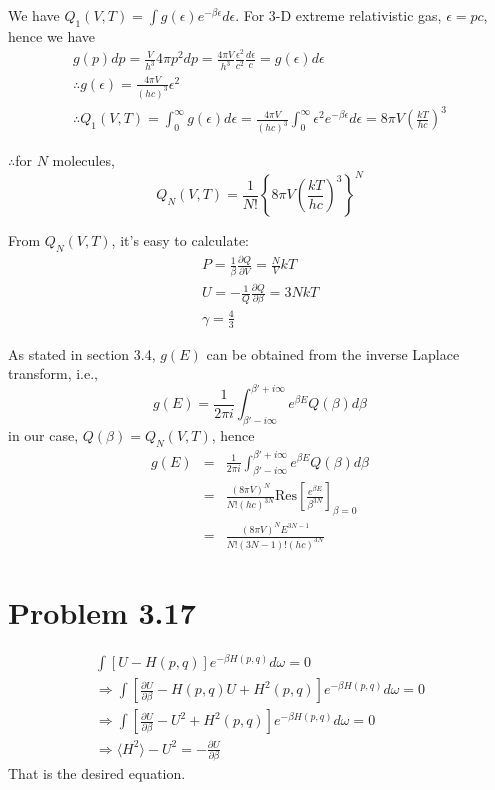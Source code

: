 \documentclass{article}
\begin{document}
	We have $Q_1(V,T)=\int g(\epsilon) e^{-\beta \epsilon}d \epsilon $. For 3-D extreme relativistic gas, $\epsilon =pc $, hence we have
	\begin{gather*}
		g(p)dp=\frac{V}{h^3}4 \pi p^2dp = \frac{4 \pi V }{h^3} \frac{\epsilon^2}{c^2} \frac{d \epsilon}{c} = g(\epsilon)d \epsilon\\
		\therefore g(\epsilon)=\frac{4 \pi V}{(hc)^3} \epsilon^2\\
		\therefore Q_1(V,T)=\int^{\infty}_0 g(\epsilon)d \epsilon=\frac{4 \pi V}{(hc)^3} \int^{\infty}_0 \epsilon^2 e^{-\beta \epsilon}d \epsilon = 8 \pi V \left( \frac{kT}{hc} \right)^3
	\end{gather*}
	
	$\therefore$for $N$ molecules,
	\begin{equation*}
		Q_N(V,T)= \frac{1}{N!}\left\{ 8 \pi V \left( \frac{kT}{hc} \right)^3\right\}^N
	\end{equation*}

	From $Q_N(V,T)$, it's easy to calculate:
	\begin{gather*}
		P=\frac{1}{\beta} \frac{\partial Q}{\partial V} = \frac{N}{V}kT\\
		U = -\frac{1}{Q} \frac{\partial Q}{\partial \beta}=3NkT\\
		\gamma = \frac{4}{3}
	\end{gather*}


	As stated in section 3.4, $g(E) $ can be obtained from the inverse Laplace transform, i.e.,
	\begin{equation*}
		g(E)=\frac{1}{2 \pi i}\int_{\beta'-i\infty}^{\beta'+i\infty} e^{\beta E} Q(\beta)d \beta
	\end{equation*}
	in our case, $Q(\beta)=Q_N(V, T) $, hence
	\begin{eqnarray*}
		g(E) &=& \frac{1}{2 \pi i}\int_{\beta'-i\infty}^{\beta'+i\infty} e^{\beta E} Q(\beta)d \beta\\
		&=& \frac{(8 \pi  V)^N}{N!(hc)^{3N} } \text{Res}\left[ \frac{e^{\beta E}}{\beta^{3N}} \right]_{\beta=0}\\
		&=& \frac{(8 \pi  V)^N E^{3N-1}}{N!(3N-1)!(hc)^{3N} }
	\end{eqnarray*}


\section*{Problem 3.17}
\begin{eqnarray*}
\int [U-H(p,q)]e^{-\beta H(p,q)}d\omega=0 \\
\Rightarrow \int [\frac{\partial U}{\partial \beta}-H(p,q)U+H^2(p,q)]e^{-\beta H(p,q)}d\omega=0 \\
\Rightarrow \int [\frac{\partial U}{\partial \beta}-U^2+H^2(p,q)]e^{-\beta H(p,q)}d\omega=0  \\
\Rightarrow \langle H^2\rangle-U^2=-\frac{\partial U}{\partial \beta}
\end{eqnarray*}
That is the desired equation.
\end{document}
